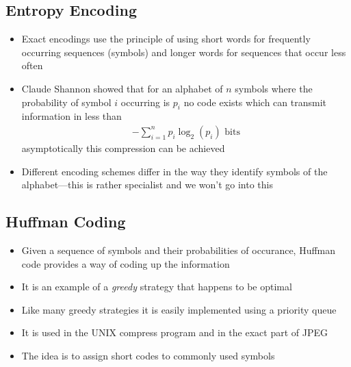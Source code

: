 
\begin{slide}
\section[-2]{Entropy Encoding}

\begin{PauseHighLight}
  \begin{itemize}
  \item Exact encodings use the principle of using short words for
    frequently occurring sequences (symbols) and longer words for
    sequences that occur less often\pause
  \item Claude Shannon showed that for an alphabet of $n$ symbols where the
    probability of symbol $i$ occurring is $p_i$ no code exists which
    can transmit information in less than
    \begin{align*}
      -\sum_{i=1}^n p_i \log_2(p_i) \,\,\text{bits}
    \end{align*}
    asymptotically this compression can be achieved\pause
  \item Different encoding schemes differ in the way they identify
    symbols of the alphabet\pause---this is rather specialist and we
    won't go into this\pauseb
  \end{itemize}
\end{PauseHighLight}


\end{slide}


\begin{slide}
\section[-1]{Huffman Coding}

\begin{PauseHighLight}
  \begin{itemize}
  \item Given a sequence of symbols and their probabilities of
    occurance, Huffman code provides a way of coding up the
    information\pause
  \item It is an example of a \emph{greedy} strategy that happens to be
    optimal\pause
  \item Like many greedy strategies it is easily implemented using a
    priority queue\pause
  \item It is used in the UNIX compress program and in the exact part of
    JPEG\pause
  \item The idea is to assign short codes to commonly used symbols\pause
  \end{itemize}
\end{PauseHighLight}

\end{slide}

